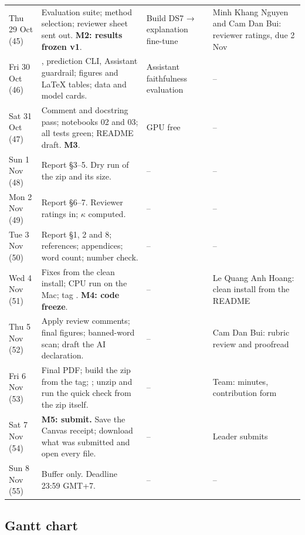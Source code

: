 \begin{longtable}{@{}L{2.1cm}L{6.2cm}L{3.0cm}L{2.9cm}@{}}
Thu 29 Oct (45) & Evaluation suite; method selection; reviewer sheet sent out. \textbf{M2: results frozen v1}. & Build DS7 → explanation fine-tune & Minh Khang Nguyen and Cam Dan Bui: reviewer ratings, due 2 Nov \\
Fri 30 Oct (46) & , prediction CLI, Assistant guardrail; figures and LaTeX tables; data and model cards. & Assistant faithfulness evaluation & -- \\
Sat 31 Oct (47) & Comment and docstring pass; notebooks 02 and 03; all tests green; README draft. \textbf{M3}. & GPU free & -- \\
Sun 1 Nov (48) & Report §3--5. Dry run of the zip and its size. & -- & -- \\
Mon 2 Nov (49) & Report §6--7. Reviewer ratings in; $\kappa$ computed. & -- & -- \\
Tue 3 Nov (50) & Report §1, 2 and 8; references; appendices; word count; number check. & -- & -- \\
Wed 4 Nov (51) & Fixes from the clean install; CPU run on the Mac; tag . \textbf{M4: code freeze}. & -- & Le Quang Anh Hoang: clean install from the README \\
Thu 5 Nov (52) & Apply review comments; final figures; banned-word scan; draft the AI declaration. & -- & Cam Dan Bui: rubric review and proofread \\
Fri 6 Nov (53) & Final PDF; build the zip from the tag; ; unzip and run the quick check from the zip itself. & -- & Team: minutes, contribution form \\
Sat 7 Nov (54) & \textbf{M5: submit.} Save the Canvas receipt; download what was submitted and open every file. & -- & Leader submits \\
Sun 8 Nov (55) & Buffer only. Deadline 23:59 GMT+7. & -- & -- \\
\bottomrule
\end{longtable}

\subsection{Gantt chart}

